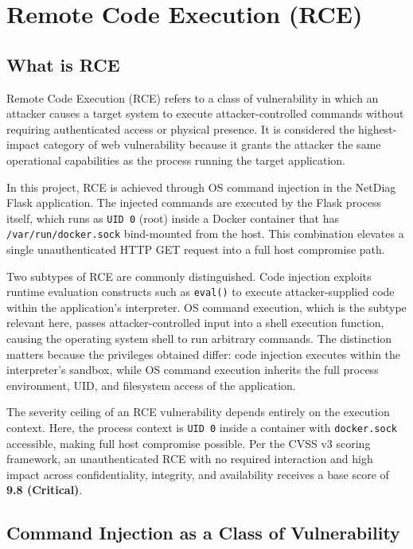 \chapter{Remote Code Execution (RCE)}

\section{What is RCE}

Remote Code Execution (RCE) refers to a class of vulnerability in which an attacker causes a target system to execute attacker-controlled commands without requiring authenticated access or physical presence. It is considered the highest-impact category of web vulnerability because it grants the attacker the same operational capabilities as the process running the target application.

In this project, RCE is achieved through OS command injection in the NetDiag Flask application. The injected commands are executed by the Flask process itself, which runs as \texttt{UID 0} (root) inside a Docker container that has \texttt{/var/run/docker.sock} bind-mounted from the host. This combination elevates a single unauthenticated HTTP GET request into a full host compromise path.

Two subtypes of RCE are commonly distinguished. Code injection exploits runtime evaluation constructs such as \texttt{eval()} to execute attacker-supplied code within the application's interpreter. OS command execution, which is the subtype relevant here, passes attacker-controlled input into a shell execution function, causing the operating system shell to run arbitrary commands. The distinction matters because the privileges obtained differ: code injection executes within the interpreter's sandbox, while OS command execution inherits the full process environment, UID, and filesystem access of the application.

The severity ceiling of an RCE vulnerability depends entirely on the execution context. Here, the process context is \texttt{UID 0} inside a container with \texttt{docker.sock} accessible, making full host compromise possible. Per the CVSS v3 scoring framework, an unauthenticated RCE with no required interaction and high impact across confidentiality, integrity, and availability receives a base score of \textbf{9.8 (Critical)}.

\vspace{0.3cm}

\section{Command Injection as a Class of Vulnerability}

